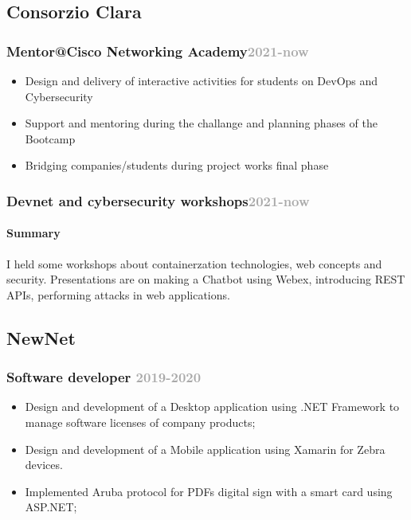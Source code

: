 \documentclass[11pt,a4paper]{article}
\begin{document}
  \subsection{Consorzio Clara}
  \subsubsection{Mentor@Cisco Networking Academy\hfill \textcolor{darkgray}{\small{2021-now}}}

  \begin{itemize}
    \item Design and delivery of interactive activities for students on DevOps and Cybersecurity
    \item Support and mentoring during the challange and planning phases of the Bootcamp
    \item Bridging companies/students during project works final phase
  \end{itemize}

  \subsubsection{Devnet and cybersecurity workshops\hfill \textcolor{darkgray}{\small{2021-now}}}

  \paragraph{Summary}I held some workshops about containerzation technologies, web concepts and security.
  Presentations are on making a Chatbot using Webex, introducing REST APIs, performing attacks in web applications.

  \subsection{NewNet}
  \subsubsection{Software developer \hfill \textcolor{darkgray}{\small{2019-2020}}}
  \begin{itemize}
    \item Design and development of a Desktop application using .NET Framework to manage software licenses of company products;
    \item Design and development of a Mobile application using Xamarin for Zebra devices.
    \item Implemented Aruba protocol for PDFs digital sign with a smart card using ASP.NET;
  \end{itemize}
\end{document}
